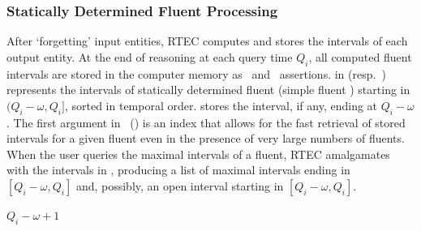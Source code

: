 \subsubsection{Statically Determined Fluent Processing}


After `forgetting' input entities, RTEC computes and stores the intervals of each output entity. At the end of reasoning at each query time $Q_i$, all computed fluent intervals are stored in the computer memory as \simpleFPList\ and \sdFPList\ assertions.  in  (resp.~) represents the intervals of statically determined fluent  (simple fluent ) starting in $(Q_{i}{-}\omega, Q_{i}]$, sorted in temporal order.  stores the interval, if any, ending at $Q_{i}{-}\omega$. The first argument in \sdFPList\ (\simpleFPList) is an index that allows for the fast retrieval of stored intervals for a given fluent  even in the presence of very large numbers of fluents. When the user queries  the maximal intervals of a fluent, RTEC amalgamates  with the intervals in , producing a list of maximal intervals ending in $[Q_{i}{-}\omega, Q_{i}]$ and, possibly, an open interval starting in $[Q_{i}{-}\omega, Q_{i}]$.


\begin{algorithm}[h]                   
\caption{ \ $\mathit{Q_i{-}\omega}$\textttsmall{)} }  
\label{pc:recogniseSDFluent}                          
\begin{algorithmic}[1]
\STATE {}
\STATE {}
\STATE {}
\IF {\textttsmall{Start,End:[Start,End)} $\in$ \textttsmall{OldList } $\wedge\ $ \textttsmall{End>}$\mathit{Q_i{-}\omega\ \wedge\ }$ \textttsmall{Start=<} $\mathit{Q_i{-}\omega}$ } %
\STATE \textttsmall{PE:=[(Start,}$\mathit{Q_i{-}\omega{+}1}$\textttsmall{)]}
\ELSE 
\STATE {}
\ENDIF 
\STATE {}
\STATE {}
\end{algorithmic}
\end{algorithm}


